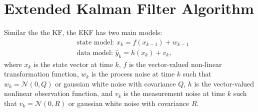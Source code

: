 \clearpage

\section{Extended Kalman Filter Algorithm}
Similar the the KF, the EKF has two main models:
\begin{align*}
&\text{state model: }  x_{k} = f( x_{k-1}) + w_{k-1}\\
&\text{data model: }  \hat y_k = h( x_k) + v_k,
\end{align*}
where $x_k$ is the state vector at time $k$, $f$ is the vector-valued non-linear transformation function, $w_k$ is the process noise at time $k$ such that $w_k = \mathcal{N}(0, Q)$ or  gaussian white noise with covariance $Q$, $h$ is the vector-valued nonlinear observation function, and $v_k$ is the measurement noise at time $k$ such that $v_k = \mathcal{N}(0, R)$ or gaussian white noise with covariance $R$. \\


